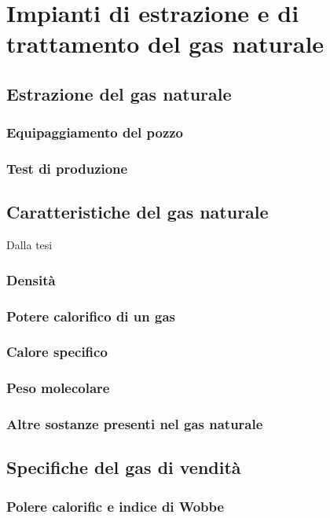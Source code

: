 \chapter{Impianti di estrazione e di trattamento del gas naturale}

\section{Estrazione del gas naturale}
\subsection{Equipaggiamento del pozzo}
\subsection{Test di produzione}

\section{Caratteristiche del gas naturale}
Dalla tesi
\subsection{Densità}
\subsection{Potere calorifico di un gas}
\subsection{Calore specifico}
\clearpage{\pagestyle{empty}\cleardoublepage}
\subsection{Peso molecolare}
\subsection{Altre sostanze presenti nel gas naturale}

\section{Specifiche del gas di vendità}
\subsection{Polere calorific e indice di Wobbe}
